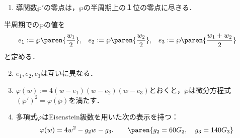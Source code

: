 \documentclass[uplatex, dvipdfmx]{jsreport}
\begin{document}
\begin{theorem}\mbox{}
    \begin{enumerate}
        \item 導関数$\wp'$の零点は，$\wp$の半周期上の１位の零点に尽きる．
    \end{enumerate}
    半周期での$\wp$の値を
    \begin{align*}
        e_1&:=\wp\paren{\frac{w_1}{2}},&e_2&:=\wp\paren{\frac{w_2}{2}},&e_3&:=\wp\paren{\frac{w_1+w_2}{2}}
    \end{align*}
    と定める．
    \begin{enumerate}\setcounter{enumi}{1}
        \item $e_1,e_2,e_3$は互いに異なる．
        \item $\varphi(w):=4(w-e_1)(w-e_2)(w-e_3)$とおくと，$\wp$は微分方程式$(\wp')^2=\varphi(\wp)$を満たす．
        \item 多項式$\varphi$はEisenstein級数を用いた次の表示を持つ：
        \[\varphi(w)=4w^2-g_2w-g_3.\qquad\paren{g_2=60G_2,\quad g_3=140G_3}\]
    \end{enumerate}
\end{theorem}
\end{document}
